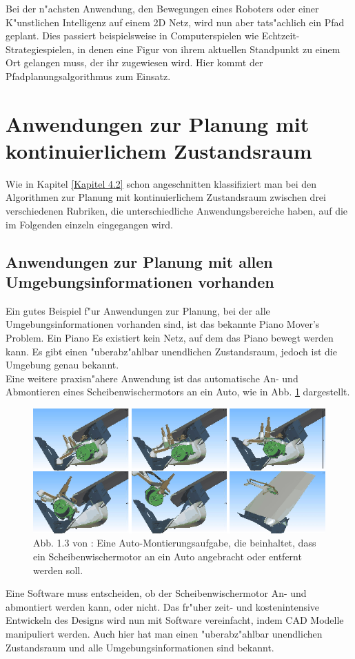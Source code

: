 Bei der n"achsten Anwendung, den Bewegungen eines Roboters oder einer K"unstlichen Intelligenz auf einem 2D Netz, wird nun aber tats"achlich ein Pfad geplant. Dies passiert beispielsweise in Computerspielen wie Echtzeit-Strategiespielen, in denen eine Figur von ihrem aktuellen Standpunkt zu einem Ort gelangen muss, der ihr zugewiesen wird. Hier kommt der Pfadplanungsalgorithmus zum Einsatz.\\
\section{Anwendungen zur Planung mit kontinuierlichem Zustandsraum}
Wie in Kapitel \ref{Kapitel 4.2} schon angeschnitten klassifiziert man bei den Algorithmen zur Planung mit kontinuierlichem Zustandsraum zwischen drei verschiedenen Rubriken, die unterschiedliche Anwendungsbereiche haben, auf die im Folgenden einzeln eingegangen wird.
\subsection{Anwendungen zur Planung mit allen Umgebungsinformationen vorhanden}
Ein gutes Beispiel f"ur Anwendungen zur Planung, bei der alle Umgebungsinformationen vorhanden sind, ist das bekannte Piano Mover's Problem. Ein Piano Es existiert kein Netz, auf dem das Piano bewegt werden kann. Es gibt einen "uberabz"ahlbar unendlichen Zustandsraum, jedoch ist die Umgebung genau bekannt.\\
Eine weitere praxisn"ahere Anwendung ist das automatische An- und Abmontieren eines Scheibenwischermotors an ein Auto, wie in Abb. \ref{Abb. 5.2} dargestellt.
\begin{figure}
	\centering
	\includegraphics[width=0.7\linewidth]{images/img231}
	\caption{Abb. 1.3 von \cite[~S. 7]{Lav06}: Eine Auto-Montierungsaufgabe, die beinhaltet, dass ein Scheibenwischermotor an ein Auto angebracht oder entfernt werden soll.}
	\label{Abb. 5.2}
\end{figure}

Eine Software muss entscheiden, ob der Scheibenwischermotor An- und abmontiert werden kann, oder nicht. Das fr"uher zeit- und kostenintensive Entwickeln des Designs wird nun mit Software vereinfacht, indem CAD Modelle manipuliert werden. Auch hier hat man einen "uberabz"ahlbar unendlichen Zustandsraum und alle Umgebungsinformationen sind bekannt.
